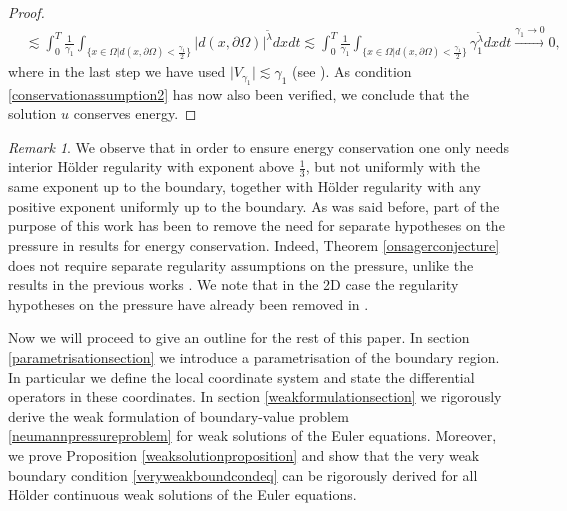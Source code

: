 \documentclass[12pt,a4paper]{article}
\theoremstyle{definition}
\theoremstyle{remark}
\newtheorem{remark}[theorem]{Remark}
\numberwithin{equation}{section}
\begin{document}
\begin{proof}
\begin{align*}
&\lesssim \int_0^T \frac{1}{\gamma_1} \int_{\big\{ x \in \Omega \big\lvert d(x, \partial \Omega) < \frac{\gamma_1}{2} \big\}} \lvert d(x, \partial \Omega) \rvert^{\widetilde{\lambda}} dx dt \lesssim \int_0^T \frac{1}{\gamma_1} \int_{\big\{ x \in \Omega \big\lvert d(x, \partial \Omega) < \frac{\gamma_1}{2} \big\}} \gamma_1^{\widetilde{\lambda}} dx dt \xrightarrow[]{\gamma_1 \rightarrow 0} 0,
\end{align*}
where in the last step we have used $\lvert V_{\gamma_1} \rvert \lesssim \gamma_1$ (see \cite[~p. 199]{titi2018}). As condition \eqref{conservationassumption2} has now also been verified, we conclude that the solution $u$ conserves energy.
\end{proof}
\begin{remark}
We observe that in order to ensure energy conservation one only needs interior Hölder regularity with exponent above $\frac{1}{3}$, but not uniformly with the same exponent up to the boundary, together with Hölder regularity with any positive exponent uniformly up to the boundary. As was said before, part of the purpose of this work has been to remove the need for separate hypotheses on the pressure in results for energy conservation. Indeed, Theorem \ref{onsagerconjecture} does not require separate regularity assumptions on the pressure, unlike the results in the previous works \cite{titi2018,titi2019,drivas2018}. We note that in the 2D case the regularity hypotheses on the pressure have already been removed in \cite{bardos2021}.
\end{remark}

Now we will proceed to give an outline for the rest of this paper. In section \ref{parametrisationsection} we introduce a parametrisation of the boundary region. In particular we define the local coordinate system and state the differential operators in these coordinates. In section \ref{weakformulationsection} we rigorously derive the weak formulation of boundary-value problem \eqref{neumannpressureproblem} for weak solutions of the Euler equations. Moreover, we prove Proposition \ref{weaksolutionproposition} and show that the very weak boundary condition \eqref{veryweakboundcondeq} can be rigorously derived for all Hölder continuous weak solutions of the Euler equations.
\end{document}
